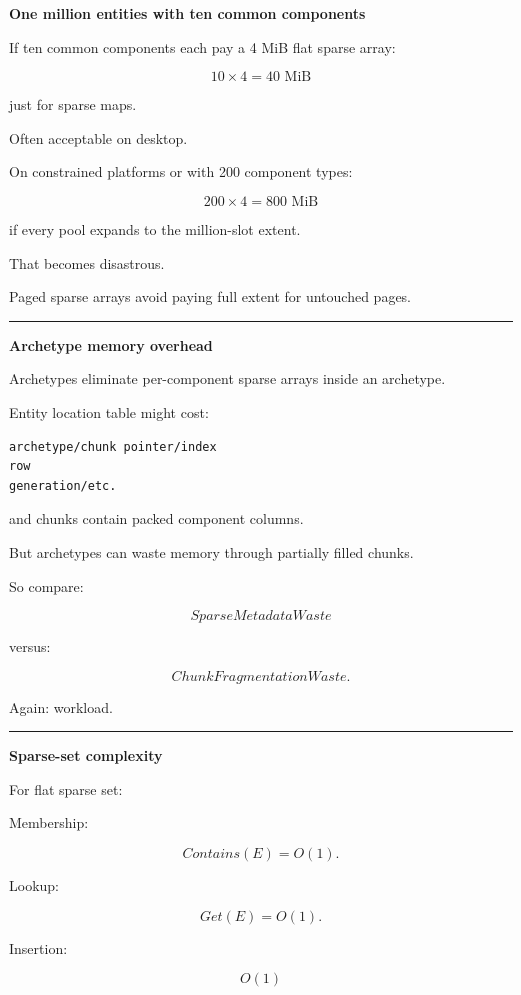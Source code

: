 \textbf{One million entities with ten common components}

If ten common components each pay a 4 MiB flat sparse array:

\[
10\times4
=
40\text{ MiB}
\]

just for sparse maps.

Often acceptable on desktop.

On constrained platforms or with 200 component types:

\[
200\times4
=
800\text{ MiB}
\]

if every pool expands to the million-slot extent.

That becomes disastrous.

Paged sparse arrays avoid paying full extent for untouched pages.

\begin{center}\rule{0.5\linewidth}{0.5pt}\end{center}

\textbf{Archetype memory overhead}

Archetypes eliminate per-component sparse arrays inside an archetype.

Entity location table might cost:

\begin{verbatim}
archetype/chunk pointer/index
row
generation/etc.
\end{verbatim}

and chunks contain packed component columns.

But archetypes can waste memory through partially filled chunks.

So compare:

\[
SparseMetadataWaste
\]

versus:

\[
ChunkFragmentationWaste.
\]

Again: workload.

\begin{center}\rule{0.5\linewidth}{0.5pt}\end{center}

\textbf{Sparse-set complexity}

For flat sparse set:

Membership:

\[
Contains(E)=O(1).
\]

Lookup:

\[
Get(E)=O(1).
\]

Insertion:

\[
O(1)
\]


